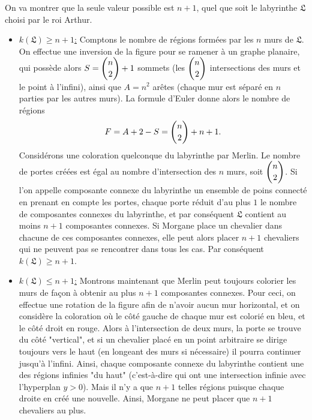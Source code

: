 \begin{sol}
On va montrer que la seule valeur possible est $n+1$, quel que soit le labyrinthe $\mathfrak{L}$ choisi par le roi Arthur.

\begin{itemize}
\item \underline{$k(\mathfrak{L})\ge n+1$:} Comptons le nombre de régions formées par les $n$ murs de $\mathfrak{L}$. On effectue une inversion de la figure pour se ramener à un graphe planaire, qui possède alors $S = \dbinom n2 + 1$ sommets (les $\dbinom n2$ intersections des murs et le point à l'infini), ainsi que $A = n^2$ arêtes (chaque mur est séparé en $n$ parties par les autres murs). La formule d'Euler donne alors le nombre de régions
$$F = A + 2 - S = \dbinom n2 + n + 1.$$
Considérons une coloration quelconque du labyrinthe par Merlin. Le nombre de portes créées est égal au nombre d'intersection des $n$ murs, soit $\dbinom n2$. Si l'on appelle composante connexe du labyrinthe un ensemble de poins connecté en prenant en compte les portes, chaque porte réduit d'au plus $1$ le nombre de composantes connexes du labyrinthe, et par conséquent $\mathfrak{L}$ contient au moins $n+1$ composantes connexes. Si Morgane place un chevalier dans chacune de ces composantes connexes, elle peut alors placer $n+1$ chevaliers qui ne peuvent pas se rencontrer dans tous les cas. Par conséquent $k(\mathfrak{L})\ge n+1$.

\item \underline{$k(\mathfrak{L})\le n+1$:} Montrons maintenant que Merlin peut toujours colorier les murs de façon à obtenir au plus $n+1$ composantes connexes. Pour ceci, on effectue une rotation de la figure afin de n'avoir aucun mur horizontal, et on considère la coloration où le côté gauche de chaque mur est colorié en bleu, et le côté droit en rouge. Alors à l'intersection de deux murs, la porte se trouve du côté "vertical", et si un chevalier placé en un point arbitraire se dirige toujours vers le haut (en longeant des murs si nécessaire) il pourra continuer jusqu'à l'infini. Ainsi, chaque composante connexe du labyrinthe contient une des régions infinies "du haut" (c'est-à-dire qui ont une intersection infinie avec l'hyperplan $y>0$). Mais il n'y a que $n+1$ telles régions puisque chaque droite en créé une nouvelle. Ainsi, Morgane ne peut placer que $n+1$ chevaliers au plus.
\end{itemize}
\end{sol}

